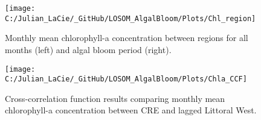 \documentclass[]{interact}
\theoremstyle{plain}%
\theoremstyle{definition}
\theoremstyle{remark}
\begin{document}
\begin{figure}[H]
\texttt{[image: C:/Julian\_LaCie/\_GitHub/LOSOM\_AlgalBloom/Plots/Chl\_region]} \caption{\label{fig:fig3} Monthly mean chlorophyll-a concentration between regions for all months (left) and algal bloom period (right).}\label{fig:unnamed-chunk-5}
\end{figure}

\begin{figure}[H]

{\centering \texttt{[image: C:/Julian\_LaCie/\_GitHub/LOSOM\_AlgalBloom/Plots/Chla\_CCF]} 

}

\caption{\label{fig:fig4}Cross-correlation function results comparing monthly mean chlorophyll-a concentration between CRE and lagged Littoral West. }\label{fig:unnamed-chunk-6}
\end{figure}

\providecommand{\docline}[3]{\noalign{\global\setlength{\arrayrulewidth}{#1}}\arrayrulecolor[HTML]{#2}\cline{#3}}

\setlength{\tabcolsep}{2pt}

\renewcommand*{\arraystretch}{1.5}
\end{document}
